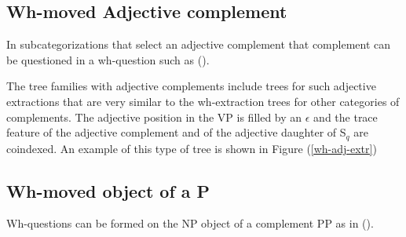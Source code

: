 \subsection{Wh-moved Adjective complement}
In subcategorizations that select an adjective complement that
complement can be questioned in a wh-question such as ().


The tree families with adjective complements include trees for such
adjective extractions that are very similar to the wh-extraction trees
for other categories of complements.  The adjective position in the VP
is filled by an $\epsilon$ and the trace feature of the adjective
complement and of the adjective daughter of S$_{q}$ are coindexed.  An
example of this type of tree is shown in Figure (\ref{wh-adj-extr})

\begin{figure}[htbp]
\end{figure}

\subsection{Wh-moved object of a P}
Wh-questions can be formed on the NP object of a complement PP as in
().

